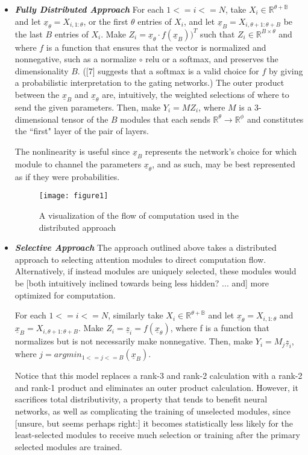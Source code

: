 \documentclass[12pt]{article}
\begin{document}
\begin{itemize}

\item \label{Fully Distributed} \textit{\textbf{Fully Distributed Approach}} For each $1<=i<=N$, take $X_i \in \mathbb{R^{\theta+B}}$ and let $\underline{x}_\theta = X_{i,1:\theta}$, or the first $\theta$ entries of $X_i$, and let $\underline{x}_B = X_{i, \theta+1:\theta+B}$ be the last $B$ entries of $X_i$.  Make $Z_i = \underline{x}_\theta \cdot f(\underline{x}_B))^{T}$ such that $Z_i \in \mathbb{R}^{B\times\theta}$ and where $f$ is a function that ensures that the vector is normalized and nonnegative, such as a normalize $\circ$ relu or a softmax, and preserves the dimensionality $B$.  ([7] suggests that a softmax is a valid choice for $f$ by giving a probabilistic interpretation to the gating networks.) The outer product between the $\underline{x}_B$ and $\underline{x}_\theta$ are, intuitively, the weighted selections of where to send the given parameters. Then, make $Y_i = MZ_i$, where $M$ is a 3-dimensional tensor of the $B$ modules that each sends $\mathbb{R}^{\theta}\rightarrow\mathbb{R}^{\phi}$ and constitutes the ``first" layer of the pair of layers.
\par The nonlinearity is useful since $\underline{x}_B$ represents the network's choice for which module to channel the parameters $\underline{x}_\theta$, and as such, may be best represented as if they were probabilities.\par
\begin{figure}[h]
\centering
\texttt{[image: figure1]}
\centering
\caption{A visualization of the flow of computation used in the distributed approach}
\end{figure}

\item \label{Selective Approach} \textit{\textbf{Selective Approach}} The approach outlined above takes a distributed approach to selecting attention modules to direct computation flow.  Alternatively, if instead modules are uniquely selected, these modules would be [both intuitively inclined towards being less hidden? ... and] more optimized for computation.\par
For each $1<=i<=N$, similarly take $X_i \in \mathbb{R^{\theta+B}}$ and let $\underline{x}_\theta = X_{i,1:\theta}$ and $\underline{x}_B = X_{i, \theta+1:\theta+B}$.  Make $Z_i = \underline{z}_i = f(\underline{x}_\theta)$, where f is a function that normalizes but is not necessarily make nonnegative.  Then, make $Y_i = M_j\underline{z}_i$, where $j = argmin_{1<=j<=B} ( \underline{x}_B )$.  \par
Notice that this model replaces a rank-3 and rank-2 calculation with a rank-2 and rank-1 product and eliminates an outer product calculation.  However, it sacrifices total distributivity, a property that tends to benefit neural networks, as well as complicating the training of unselected modules, since [unsure, but seems perhaps right:] it becomes statistically less likely for the least-selected modules to receive much selection or training after the primary selected modules are trained.

\end{itemize}
\end{document}
